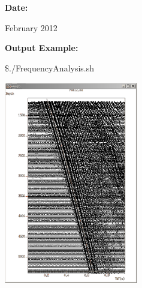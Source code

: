 \documentclass{article}
\begin{document}
\vspace{4pt}
\leftskip=0pt
\textbf{Date:}

\vspace{4pt}
\leftskip=18pt
February 2012 

\vspace{16pt}
\leftskip=0pt
\textbf{Output Example:\pagebreak{}}

\vspace{4pt}
\$./FrequencyAnalysis.sh

\vspace{28pt}
\includegraphics[width=166pt, height=251pt, keepaspectratio=true]{LatihanVSPsu-fig005.pdf}
\end{document}
